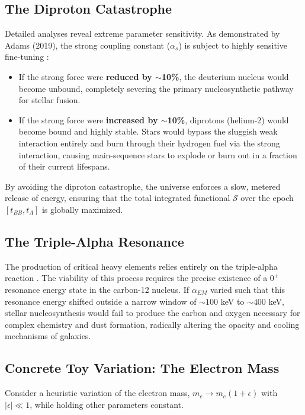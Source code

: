 \documentclass[12pt,a4paper]{article}
\theoremstyle{remark}
\begin{document}
\subsection{The Diproton Catastrophe}

Detailed analyses reveal extreme parameter sensitivity. As demonstrated by Adams (2019), the strong coupling constant ($\alpha_s$) is subject to highly sensitive fine-tuning \citep{Adams2019}:

\begin{itemize}
    \item If the strong force were \textbf{reduced by $\sim$10\%}, the deuterium nucleus would become unbound, completely severing the primary nucleosynthetic pathway for stellar fusion.
    \item If the strong force were \textbf{increased by $\sim$10\%}, diprotons (helium-2) would become bound and highly stable. Stars would bypass the sluggish weak interaction entirely and burn through their hydrogen fuel via the strong interaction, causing main-sequence stars to explode or burn out in a fraction of their current lifespans.
\end{itemize}

By avoiding the diproton catastrophe, the universe enforces a slow, metered release of energy, ensuring that the total integrated functional $\mathcal{S}$ over the epoch $[t_{BB}, t_\Lambda]$ is globally maximized.

\subsection{The Triple-Alpha Resonance}

The production of critical heavy elements relies entirely on the triple-alpha reaction \citep{Adams2019}. The viability of this process requires the precise existence of a $0^+$ resonance energy state in the carbon-12 nucleus. If $\alpha_{EM}$ varied such that this resonance energy shifted outside a narrow window of $\sim 100$ keV to $\sim 400$ keV, stellar nucleosynthesis would fail to produce the carbon and oxygen necessary for complex chemistry and dust formation, radically altering the opacity and cooling mechanisms of galaxies.

\subsection{Concrete Toy Variation: The Electron Mass}

Consider a heuristic variation of the electron mass, $m_e \to m_e(1+\epsilon)$ with $|\epsilon| \ll 1$, while holding other parameters constant.
\end{document}
